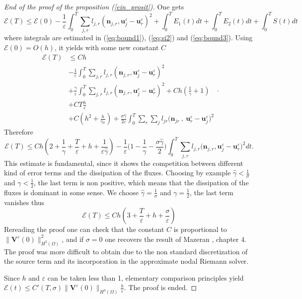 \documentclass[a4paper,french,english,10pt]{article}
\newcommand\ljr{l_{jr}}
\newcommand\njr{\mathbf{n}_{jr}}
\newcommand\eps{\varepsilon}
\newcommand{\ds}{\displaystyle}
\newcommand\V{\mathbf{V}}
\newcommand\nvhp{\|\V^\eps(0)\|_{H^3(\Omega)}}
\begin{document}
\begin{proof}[End of the proof of the proposition (\ref{ein_prosit})]
One gets
$$
\mathscr{E}(T) \leq \mathscr{E}(0)
-\frac1\eps \int_0^T \sum_{j,r}l_{j,r}(\textbf{n}_{j,r},\textbf{u}_j^{\eps}-\textbf{u}
_r^{\eps})^2 +
\int_0^T E_1(t)dt + \int_0^T E_2(t)dt
+\int_0^T S(t)dt
$$
where integrals are estimated in 
(\ref{eq:bound1}), (\ref{eq:si2}) and   
(\ref{eq:bound3}).  Using $\mathscr{E}(0)=O(h)$,  it yields with some new constant $C$
$$
\begin{array}{ll}
\mathscr{E}(T)& \leq Ch  \\
& 
\displaystyle 
-\frac1\eps \int_0^T \sum_{j,r}l_{j,r}(\textbf{n}_{j,r},\textbf{u}_j^{\eps}-\textbf{u}
_r^{\eps})^2\\
  & 
    \displaystyle            +            \frac{\gamma}{\eps}
     \int_0^T \sum_{j,r}l_{j,r}(\textbf{n}_{j,r},\textbf{u}_j^{\eps}-\textbf{u}
_r^{\eps})^2 
+Ch(  \frac 1 {\gamma } +1) \\
& \displaystyle  + C T
\frac{h}{\eps}  \\
&
 \displaystyle +C(h^2+\frac{h}{ \widehat \gamma \eps})
 +
 \frac{\sigma\hat \gamma}{2\eps} \int_0^T \sum_r \sum_j \ljr \bigg(  \njr  \: , \:
\mathbf{u}_r^{\eps}-\mathbf{u}_j^{\eps} \bigg)^2
 \end{array}.
$$
Therefore
$$
\mathscr{E}(T)\leq
Ch\left( 2 + \frac{1}{\gamma} +\frac T \eps +h +\frac{1}{\eps \widehat{\gamma}}
\right)-
\frac{1}{\eps}\bigg( 1-\frac1{\gamma} - \frac{\sigma \widehat{\gamma}}{2}
\bigg)\int_0^T \sum_{j,r}l_{j,r}\bigg(\textbf{n}_{j,r},\textbf{u}_j^{\eps}-\textbf{u}_r^{\eps} \bigg)^2 dt.
$$
This estimate is fundamental, since it 
shows the competition between different kind of error terms
and the dissipation of the fluxes.
Choosing by example $\widehat{\gamma}<\frac{1}{\sigma}$ and $\gamma<\frac12$, the last
term is non positive, which means that
the dissipation of the fluxes is dominant in some sense. We choose $\widehat{\gamma}=\frac{1}{\sigma}$ and $\gamma=\frac12$, the last term  vanishes thus
$$
\mathscr{E}(T)\leq
Ch\left( 3 +\frac T \eps +h +\frac{\sigma}{\eps}
\right)$$
 Rereading the proof one can check that the constant $C$ is proportional to  $\|\V^\eps(0)\|^2_{H^3(\Omega)} $, and  if $\sigma=0$ one recovers the result of Mazeran \cite{Mazeran}, chapter 4. The proof was more difficult to obtain due to the non standard discretization of the source term and its incorporation in  the approximate nodal Riemann solver.


 Since $h$ and $\eps$ can be taken less than 1, elementary comparison
principles 
yield
$\ds
\mathscr{E}(t) 
\leq C' (T,\sigma)\nvhp \frac{h}{\eps}$.
The proof is ended. 
\end{proof}
\end{document}
